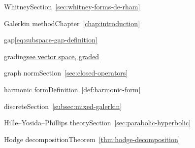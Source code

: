\par\noindent\hspace*{1em}\label{index:form-whitney}{Whitney}\quad Section~\ref{sec:whitney-forms-de-rham}

\par\noindent\hspace*{0em}\label{index:galerkin-method}{Galerkin method}\quad Chapter~\ref{chap:introduction}

\par\noindent\hspace*{0em}\label{index:gap}{gap}\quad \eqref{eq:subspace-gap-definition}

\par\noindent\hspace*{0em}\label{index:grading}{grading}\quad \hyperref[index:vector-space-graded]{{see vector space, graded}}

\par\noindent\hspace*{0em}\label{index:graph-norm}{graph norm}\quad Section~\ref{sec:closed-operators}

\par\noindent\hspace*{0em}\label{index:harmonic-form}{harmonic form}\quad Definition~\ref{def:harmonic-form}

\par\noindent\hspace*{1em}\label{index:harmonic-form-discrete}{discrete}\quad Section~\ref{subsec:mixed-galerkin}

\par\noindent\hspace*{0em}\label{index:hille-yosida-phillips-theory}{Hille–Yosida–Phillips theory}\quad Section~\ref{sec:parabolic-hyperbolic}

\par\noindent\hspace*{0em}\label{index:hodge-decomposition}{Hodge decomposition}\quad Theorem~\ref{thm:hodge-decomposition}

